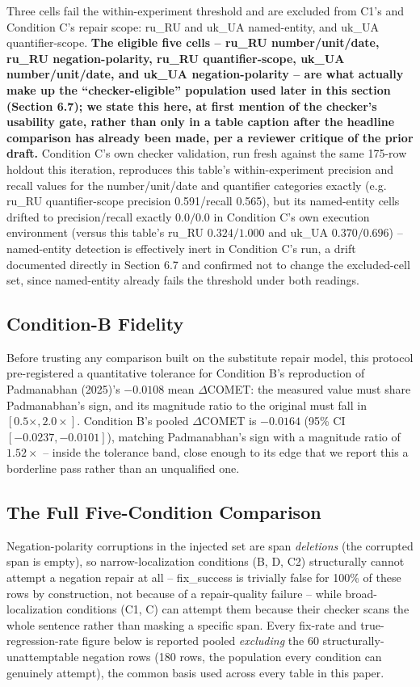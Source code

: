 \documentclass[11pt,letterpaper]{article}
\begin{document}
Three cells fail the within-experiment threshold and are excluded from C1's and Condition C's repair scope: ru\_RU and uk\_UA named-entity, and uk\_UA quantifier-scope. \textbf{The eligible five cells -- ru\_RU number/unit/date, ru\_RU negation-polarity, ru\_RU quantifier-scope, uk\_UA number/unit/date, and uk\_UA negation-polarity -- are what actually make up the ``checker-eligible'' population used later in this section (Section 6.7); we state this here, at first mention of the checker's usability gate, rather than only in a table caption after the headline comparison has already been made, per a reviewer critique of the prior draft.} Condition C's own checker validation, run fresh against the same 175-row holdout this iteration, reproduces this table's within-experiment precision and recall values for the number/unit/date and quantifier categories exactly (e.g. ru\_RU quantifier-scope precision 0.591/recall 0.565), but its named-entity cells drifted to precision/recall exactly $0.0/0.0$ in Condition C's own execution environment (versus this table's ru\_RU $0.324/1.000$ and uk\_UA $0.370/0.696$) -- named-entity detection is effectively inert in Condition C's run, a drift documented directly in Section 6.7 and confirmed not to change the excluded-cell set, since named-entity already fails the threshold under both readings.

\subsection{Condition-B Fidelity}

Before trusting any comparison built on the substitute repair model, this protocol pre-registered a quantitative tolerance for Condition B's reproduction of Padmanabhan (2025)'s $-0.0108$ mean $\Delta$COMET: the measured value must share Padmanabhan's sign, and its magnitude ratio to the original must fall in $[0.5\times, 2.0\times]$. Condition B's pooled $\Delta$COMET is $-0.0164$ (95\% CI $[-0.0237,-0.0101]$), matching Padmanabhan's sign with a magnitude ratio of $1.52\times$ -- inside the tolerance band, close enough to its edge that we report this a borderline pass rather than an unqualified one.

\subsection{The Full Five-Condition Comparison}

Negation-polarity corruptions in the injected set are span \emph{deletions} (the corrupted span is empty), so narrow-localization conditions (B, D, C2) structurally cannot attempt a negation repair at all -- fix\_success is trivially false for 100\% of these rows by construction, not because of a repair-quality failure -- while broad-localization conditions (C1, C) can attempt them because their checker scans the whole sentence rather than masking a specific span. Every fix-rate and true-regression-rate figure below is reported pooled \emph{excluding} the 60 structurally-unattemptable negation rows (180 rows, the population every condition can genuinely attempt), the common basis used across every table in this paper.
\end{document}
